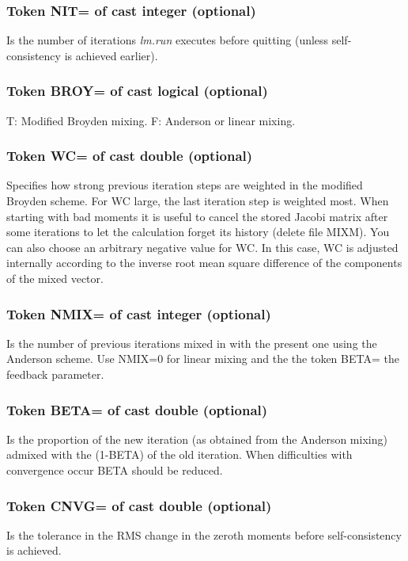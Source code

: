 \documentclass[aps,twocolumn,a4]{revtex4}
\begin{document}
\subsubsection{Token NIT= of cast integer (optional)}
Is the number of iterations {\em lm.run} executes before quitting
(unless self-consistency is achieved earlier).

\subsubsection{Token BROY= of cast logical (optional)}
T: Modified Broyden mixing. F: Anderson or linear mixing.

\subsubsection{Token WC= of cast double (optional)}
Specifies how strong previous iteration steps are weighted in
the modified Broyden scheme. For WC large, the last iteration step is
weighted most.  When starting with bad moments it is useful to cancel
the stored Jacobi matrix after some iterations to let the calculation
forget its history (delete file MIXM).
You can also choose an
arbitrary negative value for WC.  In this case, WC is adjusted
internally according to the inverse root mean square difference of the
components of the mixed vector.

\subsubsection{Token NMIX= of cast integer (optional)}
Is the number of previous iterations mixed in with the present
one using the Anderson scheme. Use NMIX=0 for linear mixing and the
the token BETA= the feedback parameter.

\subsubsection{Token BETA= of cast double (optional)}
Is the proportion of the new iteration (as obtained from the
Anderson mixing) admixed with the (1-BETA) of the old iteration. When
difficulties with convergence occur BETA should be reduced.

\subsubsection{Token CNVG= of cast double (optional)}
Is the tolerance in the RMS change in the zeroth moments before
self-consistency is achieved.
\end{document}
